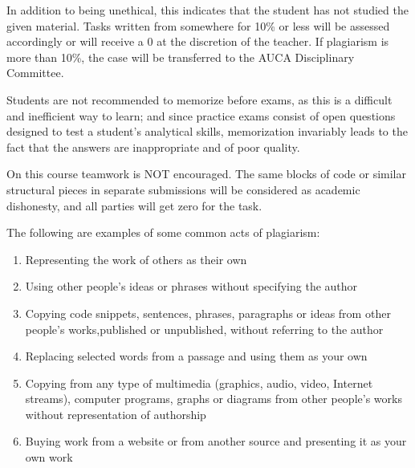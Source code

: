 \documentclass[12pt,a4paper,oneside]{article}
\begin{document}
    	In addition to being unethical, this indicates that the student has not studied the given material. Tasks written from somewhere for 10\% or less will be assessed accordingly or will receive a 0 at the discretion of the teacher. If plagiarism is more than 10\%, the case will be transferred to the AUCA Disciplinary Committee.

        Students are not recommended to memorize before exams, as this is a difficult and inefficient way to learn; and since practice exams consist of open questions designed to test a student’s analytical skills, memorization invariably leads to the fact that the answers are inappropriate and of poor quality.
        
        On this course teamwork is NOT encouraged. The same blocks of code or similar structural pieces in separate submissions will be considered as academic dishonesty, and all parties will get zero for the task.

        The following are examples of some common acts of plagiarism:
        
        \begin{enumerate}
            \item Representing the work of others as their own
            \item Using other people's ideas or phrases without specifying the author
            \item Copying code snippets, sentences, phrases, paragraphs or ideas from
                  other people's works,published or unpublished, without referring to the author
            \item Replacing selected words from a passage and using them as your own
            \item Copying from any type of multimedia (graphics, audio, video, Internet 
                  streams), computer programs, graphs or diagrams from other people's works without representation of authorship
            \item Buying work from a website or from another source and presenting it as
                  your own work
        \end{enumerate}
\end{document}
